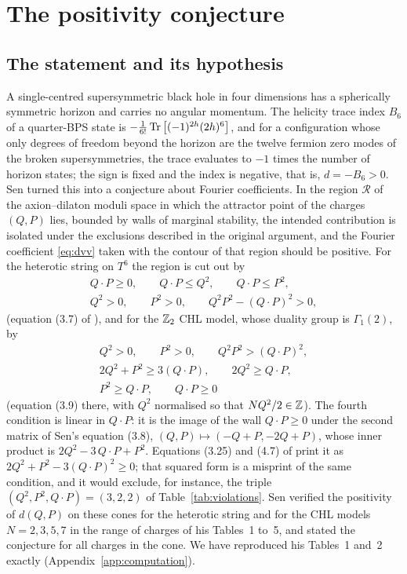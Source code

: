 \section{The positivity conjecture}\label{sec:positivity}

\subsection{The statement and its hypothesis}\label{ssec:positivitystatement}

A single-centred supersymmetric black hole in four dimensions has a spherically symmetric horizon and carries no angular momentum. The helicity trace index $B_6$ of a quarter-BPS state is $-\frac{1}{6!}\operatorname{Tr}\big[(-1)^{2h}(2h)^6\big]$, and for a configuration whose only degrees of freedom beyond the horizon are the twelve fermion zero modes of the broken supersymmetries, the trace evaluates to $-1$ times the number of horizon states; the sign is fixed and the index is negative, that is, $d = -B_6 > 0$. Sen \cite{Sen11positivity} turned this into a conjecture about Fourier coefficients. In the region $\mathcal R$ of the axion--dilaton moduli space in which the attractor point of the charges $(Q,P)$ lies, bounded by walls of marginal stability, the intended contribution is isolated under the exclusions described in the original argument, and the Fourier coefficient \eqref{eq:dvv} taken with the contour of that region should be positive. For the heterotic string on $T^6$ the region is cut out by
\begin{equation}\label{eq:senconditions}
\begin{gathered}
Q\cdot P\ge 0,\qquad Q\cdot P\le Q^2,\qquad Q\cdot P\le P^2,\\
Q^2>0,\qquad P^2>0,\qquad Q^2P^2-(Q\cdot P)^2>0,
\end{gathered}
\end{equation}
(equation (3.7) of \cite{Sen11positivity}), and for the $\mathbb{Z}_2$ CHL model, whose duality group is $\Gamma_1(2)$, by
\begin{equation}\label{eq:z2conditions}
\begin{gathered}
Q^2>0,\qquad P^2>0,\qquad Q^2P^2>(Q\cdot P)^2,\\
2Q^2+P^2\ge 3(Q\cdot P),\qquad 2Q^2\ge Q\cdot P,\\
P^2\ge Q\cdot P,\qquad Q\cdot P\ge 0
\end{gathered}
\end{equation}
(equation (3.9) there, with $Q^2$ normalised so that $NQ^2/2\in\mathbb{Z}$). The fourth condition is linear in $Q\cdot P$: it is the image of the wall $Q\cdot P\ge0$ under the second matrix of Sen's equation (3.8), $(Q,P)\mapsto(-Q+P,-2Q+P)$, whose inner product is $2Q^2-3\,Q\cdot P+P^2$. Equations (3.25) and (4.7) of \cite{CD19} print it as $2Q^2+P^2-3(Q\cdot P)^2\ge0$; that squared form is a misprint of the same condition, and it would exclude, for instance, the triple $(Q^2,P^2,Q\cdot P)=(3,2,2)$ of Table~\ref{tab:violations}. Sen verified the positivity of $d(Q,P)$ on these cones for the heterotic string and for the CHL models $N=2,3,5,7$ in the range of charges of his Tables~1 to~5, and stated the conjecture for all charges in the cone. We have reproduced his Tables~1 and~2 exactly (Appendix~\ref{app:computation}).

